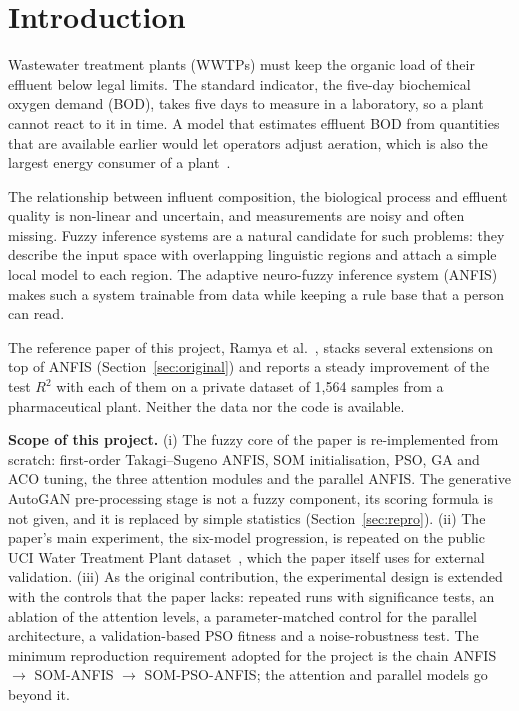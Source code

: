 \documentclass[conference]{IEEEtran}
\newcommand{\Rsq}{$R^2$}
\begin{document}
\section{Introduction}
Wastewater treatment plants (WWTPs) must keep the organic load of their effluent below legal limits. The standard indicator, the five-day biochemical oxygen demand (BOD), takes five days to measure in a laboratory, so a plant cannot react to it in time. A model that estimates effluent BOD from quantities that are available earlier would let operators adjust aeration, which is also the largest energy consumer of a plant~\cite{ramya2025}.

The relationship between influent composition, the biological process and effluent quality is non-linear and uncertain, and measurements are noisy and often missing. Fuzzy inference systems are a natural candidate for such problems: they describe the input space with overlapping linguistic regions and attach a simple local model to each region. The adaptive neuro-fuzzy inference system (ANFIS)~\cite{jang1993} makes such a system trainable from data while keeping a rule base that a person can read.

The reference paper of this project, Ramya et al.~\cite{ramya2025}, stacks several extensions on top of ANFIS (Section~\ref{sec:original}) and reports a steady improvement of the test \Rsq{} with each of them on a private dataset of 1,564 samples from a pharmaceutical plant. Neither the data nor the code is available.

\textbf{Scope of this project.} (i) The fuzzy core of the paper is re-implemented from scratch: first-order Takagi--Sugeno ANFIS, SOM initialisation, PSO, GA and ACO tuning, the three attention modules and the parallel ANFIS. The generative AutoGAN pre-processing stage is not a fuzzy component, its scoring formula is not given, and it is replaced by simple statistics (Section~\ref{sec:repro}). (ii) The paper's main experiment, the six-model progression, is repeated on the public UCI Water Treatment Plant dataset~\cite{poch1993}, which the paper itself uses for external validation. (iii) As the original contribution, the experimental design is extended with the controls that the paper lacks: repeated runs with significance tests, an ablation of the attention levels, a parameter-matched control for the parallel architecture, a validation-based PSO fitness and a noise-robustness test. The minimum reproduction requirement adopted for the project is the chain ANFIS $\rightarrow$ SOM-ANFIS $\rightarrow$ SOM-PSO-ANFIS; the attention and parallel models go beyond it.
\end{document}
